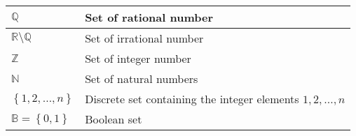 \begin{xltabular}{\textwidth}{XX}
	\(\mathbb{Q}\)                                                                                                                                          & Set of rational number                                                                                                                                                                                                                              \\ \hline
	\(\mathbb{R} \setminus \mathbb{Q}\)                                                                                                                     & Set of irrational number                                                                                                                                                                                                                            \\ \hline
	\(\mathbb{Z}\)                                                                                                                                          & Set of integer number                                                                                                                                                                                                                               \\ \hline
	\(\mathbb{N}\)                                                                                                                                          & Set of natural numbers                                                                                                                                                                                                                              \\ \hline
	\(\left\{ 1,2, \dots, n \right\}\)                                                                                                                      & Discrete set containing the integer elements \(1,2, \dots, n\)                                                                                                                                                                                      \\ \hline
	\(\mathbb{B} = \left\{ 0, 1 \right\}\)                                                                                                                  & Boolean set                                                                                                                                                                                                                                         \\ \hline %

\end{xltabular}
